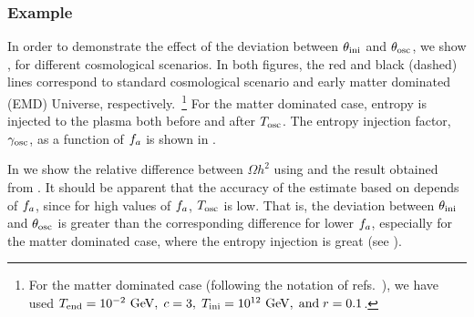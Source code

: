 \documentclass[11pt,a4paper]{article}
\begin{document}
\subsubsection{Example}\label{sec:comparison_between_WKB_approaches}
In order to demonstrate the effect of the deviation between $\theta_{\rm ini}{}$ and $\theta_{\rm osc}{}$, we show , for different cosmological scenarios. In both figures, the red and black (dashed) lines correspond to standard cosmological scenario and early matter dominated (EMD) Universe, respectively.~\footnote{For the matter dominated case (following the notation of refs.~\cite{Arias:2019uol,Arias:2020qty}), we have used 
$T_{\rm end}=10^{-2} ~{\rm GeV},\; c=3, \; T_{\rm ini}=10^{12} ~{\rm GeV}, \; \text{and}\; r=0.1$.} For the matter dominated case, entropy is injected to the plasma both before and after $T_{\rm osc}{}$. The entropy injection factor, $\gamma_{\rm osc}$, as a function of $f_{a}{}$ is shown in .

In  we show the relative difference between $\Omega h^2$ using  and the result obtained from \mimes. It should be apparent that the accuracy of the estimate based on  depends of $f_{a}{}$, since for high values of $f_{a}{}$, $T_{\rm osc}{}$ is low. That is, the deviation between $\theta_{\rm ini}{}$ and $\theta_{\rm osc}{}$ is greater than the corresponding difference for lower $f_{a}{}$, especially for the matter dominated case, where the entropy injection is great (see ).
\end{document}
